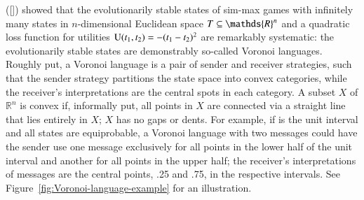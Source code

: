 \documentclass[12pt,english]{article}
\numberwithin{equation}{section}
\newcommand{\citetbjps}[1]{\citeauthor{#1} ([\citeyear{#1}])}
\begin{document}
\citetbjps{JagerMetzger2011:Voronoi-Languag} showed that the evolutionarily stable states of sim-max games with infinitely many states in $n$-dimensional Euclidean space $\States \subseteq \mathds{R}^n$ and a quadratic loss function for utilities $\mathrm{U}(t_{\mathrm{1}}, t_{\mathrm{2}}) = - (t_{\mathrm{1}} - t_{\mathrm{2}})^2$ are remarkably systematic: the evolutionarily stable states are demonstrably so-called Voronoi languages.
Roughly put, a Voronoi
language is a pair of sender and receiver strategies, such that the sender strategy partitions
the state space into convex categories, while the receiver's interpretations are the central
spots in each category. A subset $X$ of $\mathds{R}^n$ is convex if, informally put, all points
in $X$ are connected via a straight line that lies entirely in $X$; $X$ has no gaps or
dents. For example, if \States is the unit interval and all states are equiprobable, a Voronoi
language with two messages could have the sender use one message exclusively for all points in
the lower half of the unit interval and another for all points in the upper half; the
receiver's interpretations of messages are the central points, .25 and .75, in the respective
intervals.  See Figure~\ref{fig:Voronoi-language-example} for an illustration.
\end{document}

